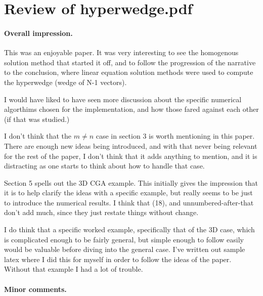 \documentclass[letterpaper]{scrreprt}
\begin{document}
\section{Review of hyperwedge.pdf}

\paragraph{Overall impression.}
This was an enjoyable paper.  It was very interesting to see the homogenous solution method that started it off, and to follow the progression of the narrative to the conclusion, where linear equation solution methods were used to compute the hyperwedge (wedge of N-1 vec{t}ors).

I would have liked to have seen more discussion about the specific numerical algorthims chosen for the implementation, and how those fared against each other (if that was studied.)

I don't think that the \( m \ne n \) case in section 3 is worth mentioning in this paper.  There are enough new ideas being introduced, and with that never being relevant for the rest of the paper, I don't think that it adds anything to mention, and it is distracting as one starts to think about how to handle that case.

Section 5 spells out the 3D CGA example.  This initially gives the impression that it is to help clarify the ideas with a specific example, but really seems to be just to introduce the numerical results.  I think that (18), and unnumbered-after-that don't add much, since they just restate things without change.

I do think that a specific worked example, specifically that of the 3D case, which is complicated enough to be fairly general, but simple enough to follow easily would be valuable before diving into the general case.  I've written out sample latex where I did this for myself in order to follow the ideas of the paper.  Without that example I had a lot of trouble.

\paragraph{Minor comments.}
\end{document}
